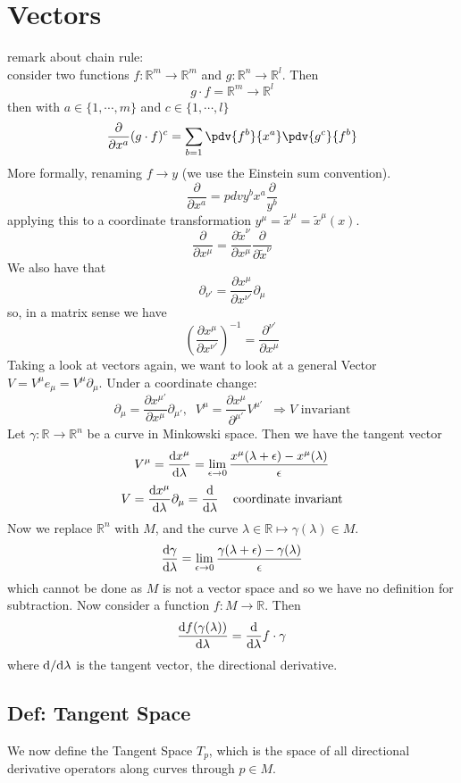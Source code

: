 \section{Vectors}

remark about chain rule:\\
consider two functions $f:\mathbb R^m\rightarrow \mathbb R^m$ and $g:\mathbb R^n \rightarrow \mathbb R^l$. Then
$$
	g\cdot f = \mathbb R^m \rightarrow \mathbb R^l
$$
then with $a\in\{1,\cdots, m\}$ and $c\in\{1,\cdots,l\}$
$$
	\frac{\partial}{\partial x^a}(g\cdot f)^c = \sum_{b=1} \pdv{f^b}{x^a} \pdv{g^c}{f^b}
$$
More formally, renaming $f\rightarrow y$ (we use the Einstein sum convention).
$$
\frac{\partial}{\partial x^a} = pdv{y^b}{x^a}\frac{\partial}{y^b}
$$
applying this to a coordinate transformation $y^\mu = \tilde x^\mu = \tilde x^\mu (x)$.
$$
\frac{\partial}{\partial x^\mu} = \frac{\partial \tilde x^\nu}{\partial x^\mu}\frac{\partial}{\partial \tilde x^\nu}
$$
We also have that
$$
\partial_{\nu'} = \frac{\partial x^\mu}{\partial x^{\nu'}}\partial_\mu
$$
so, in a matrix sense we have
$$
\left(\frac{\partial x^\mu}{\partial x^{\nu'}}\right)^{-1} = \frac{\partial^{\nu'}}{\partial x^\mu}
$$
Taking a look at vectors again, we want to look at a general Vector $V = V^\mu e_\mu = V^\mu \partial_\mu$. Under a coordinate change:
$$
\partial_\mu = \frac{\partial x^{\mu'}}{\partial x^\mu}\partial_{\mu'},\;\; V^\mu = \frac{\partial x^\mu}{\partial^{\mu'}} V^{\mu'}\;\;\Longrightarrow V\text{ invariant}
$$
Let $\gamma:\mathbb R\rightarrow \mathbb R^n$ be a curve in Minkowski space. Then we have the tangent vector
$$
	V^\mu = \frac{\text dx^\mu}{\text d\lambda} = 
	\lim_{\epsilon\rightarrow 0}\frac{x^\mu(\lambda + \epsilon) - x^\mu(\lambda)}{\epsilon}
$$
$$
	V = \frac{\text d x^\mu}{\text d\lambda}\partial_\mu = \frac{\text d}{\text d\lambda}\;\;\; \text{ coordinate invariant}
$$
Now we replace $\mathbb R^n$ with $M$, and the curve $\lambda\in\mathbb R\mapsto \gamma(\lambda)\in M$.
$$
	\frac{\text d\gamma}{\text d\lambda} = \lim_{\epsilon\rightarrow 0}\frac{\gamma(\lambda + \epsilon) - \gamma(\lambda)}{\epsilon}
$$
which cannot be done as $M$ is not a vector space and so we have no definition for subtraction. Now consider a function $f:M\rightarrow \mathbb R$. Then
$$
	\frac{\text d f(\gamma(\lambda))}{\text d\lambda} = \frac{\text d}{\text d\lambda}f\cdot\gamma
$$
where $\text d/\text d\lambda$ is the tangent vector, the directional derivative.\\
\subsection{Def: Tangent Space}
We now define the Tangent Space $T_p$, which is the space of all directional derivative operators along curves through $p\in M$.
